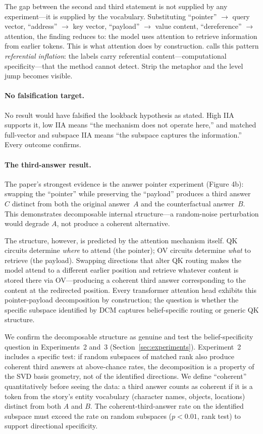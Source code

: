 \documentclass{article}
\begin{document}
The gap between the second and third statement is not supplied by any experiment---it is supplied by the vocabulary. Substituting ``pointer'' $\rightarrow$ query vector, ``address'' $\rightarrow$ key vector, ``payload'' $\rightarrow$ value content, ``dereference'' $\rightarrow$ attention, the finding reduces to: the model uses attention to retrieve information from earlier tokens. This is what attention does by construction. \citet{tower2026mechref} calls this pattern \emph{referential inflation}: the labels carry referential content---computational specificity---that the method cannot detect. Strip the metaphor and the level jump becomes visible.

\paragraph{No falsification target.}
No result would have falsified the lookback hypothesis as stated. High IIA supports it, low IIA means ``the mechanism does not operate here,'' and matched full-vector and subspace IIA means ``the subspace captures the information.'' Every outcome confirms.

\paragraph{The third-answer result.}
The paper's strongest evidence is the answer pointer experiment (Figure 4b): swapping the ``pointer'' while preserving the ``payload'' produces a third answer~$C$ distinct from both the original answer~$A$ and the counterfactual answer~$B$. This demonstrates decomposable internal structure---a random-noise perturbation would degrade $A$, not produce a coherent alternative.

The structure, however, is predicted by the attention mechanism itself. QK circuits determine \emph{where} to attend (the pointer); OV circuits determine \emph{what} to retrieve (the payload). Swapping directions that alter QK routing makes the model attend to a different earlier position and retrieve whatever content is stored there via OV---producing a coherent third answer corresponding to the content at the redirected position. Every transformer attention head exhibits this pointer-payload decomposition by construction; the question is whether the specific subspace identified by DCM captures belief-specific routing or generic QK structure.

We confirm the decomposable structure as genuine and test the belief-specificity question in Experiments~2 and~3 (Section~\ref{sec:experiments}). Experiment~2 includes a specific test: if random subspaces of matched rank also produce coherent third answers at above-chance rates, the decomposition is a property of the SVD basis geometry, not of the identified directions. We define ``coherent'' quantitatively before seeing the data: a third answer counts as coherent if it is a token from the story's entity vocabulary (character names, objects, locations) distinct from both $A$ and $B$. The coherent-third-answer rate on the identified subspace must exceed the rate on random subspaces ($p < 0.01$, rank test) to support directional specificity.
\end{document}
